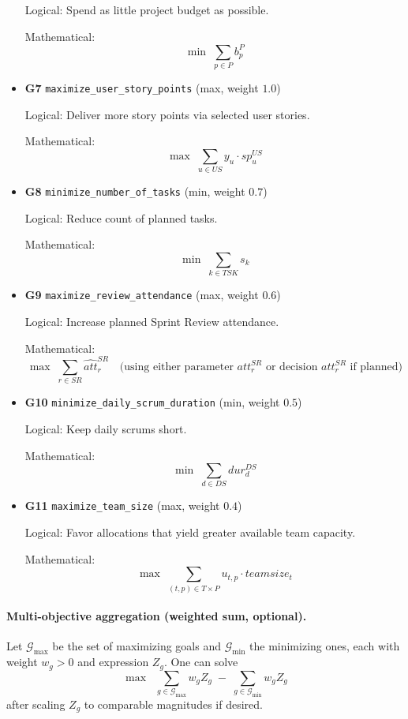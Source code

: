 \documentclass[11pt,a4paper]{article}
\begin{document}
\begin{itemize}[leftmargin=2em]
        Logical: Spend as little project budget as possible.\par
        Mathematical:
        \[
          \min \; \sum_{p\in P} b^{P}_p
        \]
  \item \textbf{G7} \texttt{maximize\_user\_story\_points} (max, weight $1.0$)\par
        Logical: Deliver more story points via selected user stories.\par
        Mathematical:
        \[
          \max \; \sum_{u\in US} y_u \cdot sp^{US}_u
        \]
  \item \textbf{G8} \texttt{minimize\_number\_of\_tasks} (min, weight $0.7$)\par
        Logical: Reduce count of planned tasks.\par
        Mathematical:
        \[
          \min \; \sum_{k\in TSK} s_k
        \]
  \item \textbf{G9} \texttt{maximize\_review\_attendance} (max, weight $0.6$)\par
        Logical: Increase planned Sprint Review attendance.\par
        Mathematical:
        \[
          \max \; \sum_{r\in SR} \widehat{att}^{SR}_r
          \quad\text{(using either parameter $att^{SR}_r$ or decision $att^{SR}_r$ if planned)}
        \]
  \item \textbf{G10} \texttt{minimize\_daily\_scrum\_duration} (min, weight $0.5$)\par
        Logical: Keep daily scrums short.\par
        Mathematical:
        \[
          \min \; \sum_{d\in DS} dur^{DS}_d
        \]
  \item \textbf{G11} \texttt{maximize\_team\_size} (max, weight $0.4$)\par
        Logical: Favor allocations that yield greater available team capacity.\par
        Mathematical:
        \[
          \max \; \sum_{(t,p)\in T\times P} u_{t,p}\cdot teamsize_t
        \]
\end{itemize}

\paragraph{Multi-objective aggregation (weighted sum, optional).}
Let $\mathcal{G}_{\max}$ be the set of maximizing goals and $\mathcal{G}_{\min}$ the minimizing ones, each with weight $w_g>0$ and expression $Z_g$. One can solve
\[
\max \;\; \sum_{g\in \mathcal{G}_{\max}} w_g Z_g \;-\; \sum_{g\in \mathcal{G}_{\min}} w_g Z_g
\]
after scaling $Z_g$ to comparable magnitudes if desired.
\end{document}

